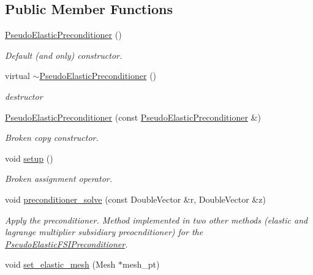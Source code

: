 \subsection*{Public Member Functions}
\begin{DoxyCompactItemize}
\item 
\hyperlink{classoomph_1_1PseudoElasticPreconditioner_ab2638e8ccceed850b8eb581fc1309ff0}{Pseudo\+Elastic\+Preconditioner} ()
\begin{DoxyCompactList}\small\item\em Default (and only) constructor. \end{DoxyCompactList}\item 
virtual \hyperlink{classoomph_1_1PseudoElasticPreconditioner_a9366f2553545b09995e40ad8fa4ed91c}{$\sim$\+Pseudo\+Elastic\+Preconditioner} ()
\begin{DoxyCompactList}\small\item\em destructor \end{DoxyCompactList}\item 
\hyperlink{classoomph_1_1PseudoElasticPreconditioner_aaf160121defa770605f1510e222b14bb}{Pseudo\+Elastic\+Preconditioner} (const \hyperlink{classoomph_1_1PseudoElasticPreconditioner}{Pseudo\+Elastic\+Preconditioner} \&)
\begin{DoxyCompactList}\small\item\em Broken copy constructor. \end{DoxyCompactList}\item 
void \hyperlink{classoomph_1_1PseudoElasticPreconditioner_a69909eef3e1530ca7faf48c653ec7327}{setup} ()
\begin{DoxyCompactList}\small\item\em Broken assignment operator. \end{DoxyCompactList}\item 
void \hyperlink{classoomph_1_1PseudoElasticPreconditioner_a2533d2574d2c7d6613fda72b96a5f885}{preconditioner\+\_\+solve} (const Double\+Vector \&r, Double\+Vector \&z)
\begin{DoxyCompactList}\small\item\em Apply the preconditioner. Method implemented in two other methods (elastic and lagrange multiplier subsidiary preocnditioner) for the \hyperlink{classoomph_1_1PseudoElasticFSIPreconditioner}{Pseudo\+Elastic\+F\+S\+I\+Preconditioner}. \end{DoxyCompactList}\item 
void \hyperlink{classoomph_1_1PseudoElasticPreconditioner_ae115b58574a36c2c8fecb2524afa54f1}{set\+\_\+elastic\+\_\+mesh} (Mesh $\ast$mesh\+\_\+pt)

\end{DoxyCompactItemize}
